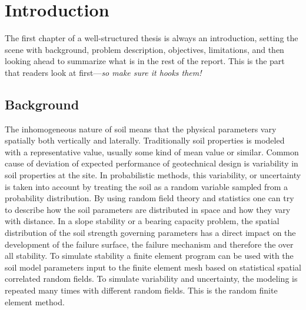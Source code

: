 \chapter{Introduction}
The first chapter of a well-structured thesis is always an introduction, setting the scene with background, problem description, objectives, limitations, and then looking ahead to summarize what is in the rest of the report. This is the part that readers look at first---\emph{so make sure it hooks them!}

\section{Background}
The inhomogeneous nature of soil means that the physical parameters vary spatially both vertically and laterally.
Traditionally soil properties is modeled with a representative value, usually some kind of mean value or similar.
Common cause of deviation of expected performance of geotechnical design is variability in soil properties at the site.
In probabilistic methods, this variability, or uncertainty is taken into account by treating the soil as a random variable sampled from a probability distribution.
By using random field theory and statistics one can try to describe how the soil parameters are distributed in space and how they vary with distance.
In a slope stability or a bearing capacity problem, the spatial distribution of the soil strength governing parameters has a direct impact on the development of the failure surface, the failure mechanism and therefore the over all stability.
To simulate stability a finite element program can be used with the soil model parameters input to the finite element mesh based on statistical spatial correlated random fields.
To simulate variability and uncertainty, the modeling is repeated many times with different random fields.
This is the random finite element method.
